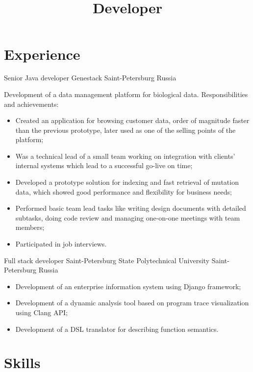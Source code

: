 \documentclass{moderncv}
\title{Developer}
\begin{document}
\makecvtitle

\section{Experience}

        {Senior Java developer}
        {Genestack}
        {Saint-Petersburg}
        {Russia}
        {Development of a data management platform for biological data. \newline{} Responsibilities and achievements:
        \begin{itemize}
            \item Created an application for browsing customer data, order of magnitude faster than the previous
            prototype, later used as one of the selling points of the platform;
            \item Was a technical lead of a small team working on integration with clients' internal systems 
            which lead to a successful go-live on time;
            \item Developed a prototype solution for indexing and fast retrieval of mutation data, which showed 
            good performance and flexibility for business needs;
            \item Performed basic team lead tasks like writing design documents with detailed subtasks, doing code review 
            and managing one-on-one meetings with team members;   
            \item Participated in job interviews.
        \end{itemize}}

        {Full stack developer}
        {Saint-Petersburg State Polytechnical University}
        {Saint-Petersburg}
        {Russia}
        {\begin{itemize}
            \item Development of an enterprise information system using Django framework;
            \item Development of a dynamic analysis tool based on program trace visualization using Clang API;
            \item Development of a DSL translator for describing function semantics.
        \end{itemize}}

\section{Skills}
\end{document}
